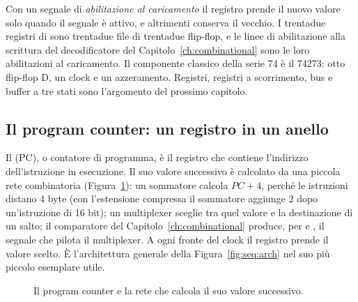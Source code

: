 Con un segnale di \emph{abilitazione al caricamento} il registro prende il
nuovo valore solo quando il segnale è attivo, e altrimenti conserva il vecchio.
I trentadue registri di \riscv sono trentadue file di trentadue flip-flop, e le
linee di abilitazione alla scrittura del decodificatore del
Capitolo~\ref{ch:combinational} sono le loro abilitazioni al caricamento. Il
componente classico della serie 74 è il 74273: otto flip-flop D, un clock e un
azzeramento. Registri, registri a scorrimento, bus e buffer a tre stati sono
l'argomento del prossimo capitolo.

\subsection{Il program counter: un registro in un anello}

Il  (PC), o contatore di programma, è il registro che
contiene l'indirizzo dell'istruzione in esecuzione. Il suo valore successivo è
calcolato da una piccola rete combinatoria (Figura~\ref{fig:seq:pc}): un
sommatore calcola $PC+4$, perché le istruzioni distano 4 byte (con l'estensione
compressa il sommatore aggiunge 2 dopo un'istruzione di 16 bit); un multiplexer
sceglie tra quel valore e la destinazione di un salto; il comparatore del
Capitolo~\ref{ch:combinational} produce, per  e , il segnale
che pilota il multiplexer. A ogni fronte del clock il registro prende il valore
scelto. È l'architettura generale della Figura~\ref{fig:seq:arch} nel suo più
piccolo esemplare utile.

\begin{figure}[htb]
\centering
{}
\caption{Il program counter e la rete che calcola il suo valore successivo.}
\label{fig:seq:pc}
\end{figure}

